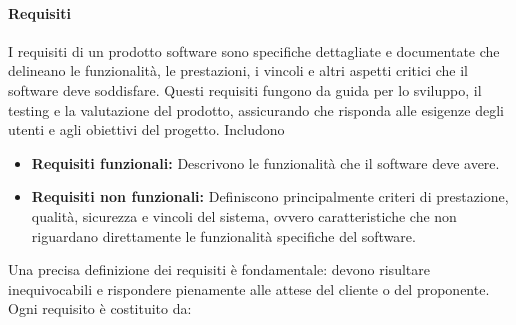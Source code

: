 \documentclass{article}
\begin{document}
\paragraph{Requisiti}
I requisiti di un prodotto software sono specifiche dettagliate e documentate che delineano le funzionalità, le prestazioni, i vincoli e altri aspetti critici che il software deve soddisfare. Questi requisiti fungono da guida per lo sviluppo, il testing e la valutazione del prodotto, assicurando che risponda alle esigenze degli utenti e agli obiettivi del progetto.
Includono
\begin{itemize}
    \item \textbf{Requisiti funzionali:} Descrivono le funzionalità che il software deve avere.
    \item \textbf{Requisiti non funzionali:} Definiscono principalmente criteri di prestazione, qualità, sicurezza e vincoli del sistema, ovvero caratteristiche che non riguardano direttamente le funzionalità specifiche del software.
\end{itemize}
Una precisa definizione dei requisiti è fondamentale: devono risultare inequivocabili e rispondere pienamente alle attese del cliente o del proponente.\\
Ogni requisito è costituito da:
\end{document}
